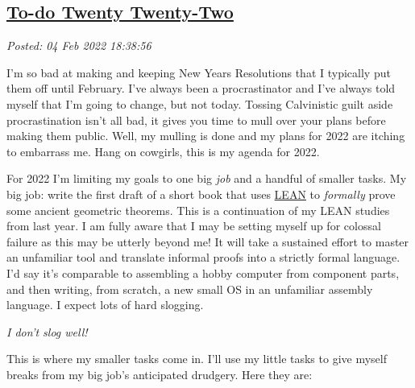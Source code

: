 %

\subsection*{\href{http://analyzethedatanotthedrivel.org/2022/02/04/to-do-twenty-twenty-two/}{To-do Twenty Twenty-Two}}


\noindent\emph{Posted: 04 Feb 2022 18:38:56}
\vspace{6pt}

I'm so bad at making and keeping New Years Resolutions that I typically
put them off until February. I've always been a procrastinator and I've
always told myself that I'm going to change, but not today. Tossing
Calvinistic guilt aside procrastination isn't all bad, it gives you time
to mull over your plans before making them public. Well, my mulling is
done and my plans for 2022 are itching to embarrass me. Hang on
cowgirls, this is my agenda for 2022.

For 2022 I'm limiting my goals to one big \emph{job} and a handful of
smaller tasks. My big job: write the first draft of a short book that
uses \href{https://leanprover-community.github.io/}{LEAN} to
\emph{formally} prove some ancient geometric theorems. This is a
continuation of my LEAN studies from last year. I am fully aware that I
may be setting myself up for colossal failure as this may be utterly
beyond me! It will take a sustained effort to master an unfamiliar tool
and translate informal proofs into a strictly formal language. I'd say
it's comparable to assembling a hobby computer from component parts, and
then writing, from scratch, a new small OS in an unfamiliar assembly
language. I expect lots of hard slogging.

\emph{I don't slog well!}

This is where my smaller tasks come in. I'll use my little tasks to give
myself breaks from my big job's anticipated drudgery. Here they are:

